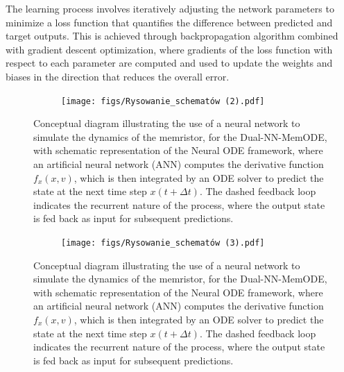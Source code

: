 \documentclass[11pt, oneside]{article}
\begin{document}
The learning process involves iteratively adjusting the network parameters to minimize a loss function that quantifies the difference between predicted and target outputs. This is  achieved through backpropagation algorithm combined with gradient descent optimization, where gradients of the loss function with respect to each parameter are computed and used to update the weights and biases in the direction that reduces the overall error.

\begin{figure}[ht]
    \centering
    \begin{subfigure}[b]{0.8\textwidth}
        \texttt{[image: figs/Rysowanie\_schematów (2).pdf]}
        \caption{}
    \end{subfigure}

    \caption{ Conceptual diagram illustrating the use of a neural network to simulate the dynamics of the memristor, for the Dual-NN-MemODE, with schematic representation of the Neural ODE framework, where an artificial neural network (ANN) computes the derivative function $f_x(x,v)$, which is then integrated by an ODE solver to predict the state at the next time step $x(t + \Delta t)$. The dashed feedback loop indicates the recurrent nature of the process, where the output state is fed back as input for subsequent predictions.}
    \label{fig:nn_structure}
\end{figure}

\begin{figure}[ht!]
    \centering
    \begin{subfigure}[b]{0.8\textwidth}
        \texttt{[image: figs/Rysowanie\_schematów (3).pdf]}
        \caption{}
    \end{subfigure}

    \caption{ Conceptual diagram illustrating the use of a neural network to simulate the dynamics of the memristor, for the Dual-NN-MemODE, with schematic representation of the Neural ODE framework, where an artificial neural network (ANN) computes the derivative function $f_x(x,v)$, which is then integrated by an ODE solver to predict the state at the next time step $x(t + \Delta t)$. The dashed feedback loop indicates the recurrent nature of the process, where the output state is fed back as input for subsequent predictions.}
    \label{fig:nn_structure_dual}
\end{figure}
\end{document}
